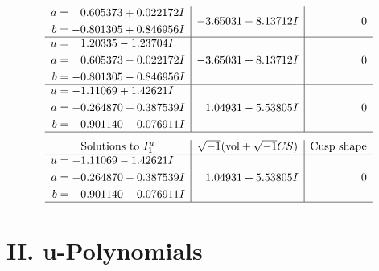 \documentclass[1p]{elsarticle_modified}
\theoremstyle{definition}
\newcommand{\I}{\sqrt{-1}}
\begin{document}
$$\begin{array}{c|c|c}
\begin{aligned}
a &= \phantom{-}0.605373 + 0.022172 I \\
b &= -0.801305 + 0.846956 I\end{aligned}
 & -3.65031 - 8.13712 I & \phantom{-0.000000 } 0 \\ \hline\begin{aligned}
u &= \phantom{-}1.20335 - 1.23704 I \\
a &= \phantom{-}0.605373 - 0.022172 I \\
b &= -0.801305 - 0.846956 I\end{aligned}
 & -3.65031 + 8.13712 I & \phantom{-0.000000 } 0 \\ \hline\begin{aligned}
u &= -1.11069 + 1.42621 I \\
a &= -0.264870 + 0.387539 I \\
b &= \phantom{-}0.901140 - 0.076911 I\end{aligned}
 & \phantom{-}1.04931 - 5.53805 I & \phantom{-0.000000 } 0\\
 \hline 
 \end{array}$$\newpage$$\begin{array}{c|c|c}  
\text{Solutions to }I^u_{1}& \I (\text{vol} + \sqrt{-1}CS) & \text{Cusp shape}\\
 \hline 
\begin{aligned}
u &= -1.11069 - 1.42621 I \\
a &= -0.264870 - 0.387539 I \\
b &= \phantom{-}0.901140 + 0.076911 I\end{aligned}
 & \phantom{-}1.04931 + 5.53805 I & \phantom{-0.000000 } 0\\
 \hline 
 \end{array}$$\newpage
\newpage\renewcommand{\arraystretch}{1}
\centering \section*{ II. u-Polynomials}
\end{document}
